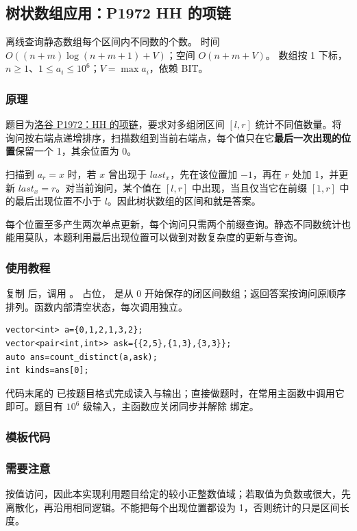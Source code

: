 \subsection{树状数组应用：P1972 HH 的项链}
\label{ds:bit-distinct}
\AlgorithmInfo
    {离线查询静态数组每个区间内不同数的个数。}
    {时间 $O((n+m)\log(n+m+1)+V)$；空间 $O(n+m+V)$。}
    {数组按 1 下标，$n\ge1$、$1\le a_i\le10^6$；$V=\max a_i$，依赖 BIT。}
\subsubsection*{原理}
题目为\href{https://www.luogu.com.cn/problem/P1972}{洛谷 P1972：HH 的项链}，要求对多组闭区间 $[l,r]$ 统计不同值数量。将询问按右端点递增排序，扫描数组到当前右端点，每个值只在它\textbf{最后一次出现的位置}保留一个 1，其余位置为 0。

扫描到 $a_r=x$ 时，若 $x$ 曾出现于 $last_x$，先在该位置加 $-1$，再在 $r$ 处加 1，并更新 $last_x=r$。对当前询问，某个值在 $[l,r]$ 中出现，当且仅当它在前缀 $[1,r]$ 中的最后出现位置不小于 $l$。因此树状数组的区间和就是答案。

每个位置至多产生两次单点更新，每个询问只需两个前缀查询。静态不同数统计也能用莫队，本题利用最后出现位置可以做到对数复杂度的更新与查询。
\subsubsection*{使用教程}
复制  后，调用 。 占位， 是从 0 开始保存的闭区间数组；返回答案按询问原顺序排列。函数内部清空状态，每次调用独立。
\begin{lstlisting}[style=mtycpp,numbers=none]
vector<int> a={0,1,2,1,3,2};
vector<pair<int,int>> ask={{2,5},{1,3},{3,3}};
auto ans=count_distinct(a,ask);
int kinds=ans[0];
\end{lstlisting}
代码末尾的  已按题目格式完成读入与输出；直接做题时，在常用主函数中调用它即可。题目有 $10^6$ 级输入，主函数应关闭同步并解除  绑定。
\subsubsection*{模板代码}
\subsubsection*{需要注意}
 按值访问，因此本实现利用题目给定的较小正整数值域；若取值为负数或很大，先离散化，再沿用相同逻辑。不能把每个出现位置都设为 1，否则统计的只是区间长度。
